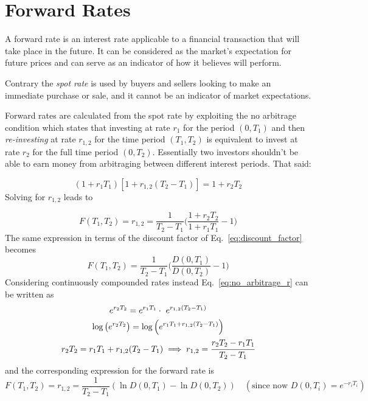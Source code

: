 \section{Forward Rates}
\label{calculating-forward-rates}
A forward rate is an interest rate applicable to a financial transaction that will take place in the future. It can be considered as the market's expectation for future prices and can serve as an indicator of how it believes will perform.

Contrary the \emph{spot rate} is used by buyers and sellers looking to make an immediate purchase or sale, and it cannot be an indicator of market expectations.

Forward rates are calculated from the spot rate by exploiting the no arbitrage condition which states that investing at rate $r_1$ for the period $(0, T_1)$ and then \emph{re-investing} at rate $r_{1,2}$ for the time period $(T_1, T_2)$ is equivalent to invest at rate $r_2$ for the full time period $(0, T_2)$. Essentially two investors shouldn't be able to earn money from arbitraging between different interest periods. That said:

\begin{equation}
(1+r_1 T_1)[1+r_{1,2}(T_2 - T_1)] = 1 + r_2 T_2
\label{eq:no_arbitrage_r}
\end{equation}
Solving for $r_{1,2}$ leads to

\begin{equation}
F(T_1, T_2) = r_{1,2} = \frac{1}{T_2 - T_1}\Big(\frac{1+r_2 T_2}{1+r_1 T_1} - 1 \Big)
\label{eq:forward_rate_simple}
\end{equation}
\vspace{1cm}
The same expression in terms of the discount factor of Eq.~\ref{eq:discount_factor} becomes
\begin{equation}
F(T_1, T_2) = \frac{1}{T_2 - T_1}\Big(\frac{D(0, T_1)}{D(0, T_2)} - 1 \Big)
\end{equation}
Considering continuously compounded rates instead Eq.~\ref{eq:no_arbitrage_r} can be written as
\begin{equation}
\begin{gathered}
e^{r_{2}T_{2}}=e^{r_{1}T_{1}}\cdot \ e^{r_{1,2} (T_{2}-T_{1})} \\
\textrm{log}\left(e^{r_{2}T_{2}}\right)=\textrm{log}\left(e^{r_{1}T_{1}+ r_{1,2} (T_{2}-T_{1})}\right) \\
r_{2}T_{2}=r_{1}T_{1}+r_{1,2}(T_{2}-T_{1})\implies r_{1,2} = \cfrac{r_2 T_2 - r_1 T_1}{T_2 - T_1} 
\end{gathered}
\end{equation}
and the corresponding expression for the forward rate is
\begin{equation}
F(T_1, T_2) = r_{1,2} = \frac {1}{T_{2}-T_{1}}(\ln D(0,T_{1})-\ln D(0,T_{2}))
\quad(\textrm{since now } D(0, T_i)=e^{-r_i T_i})
\label{eq:forward_rate_continous}
\end{equation}

